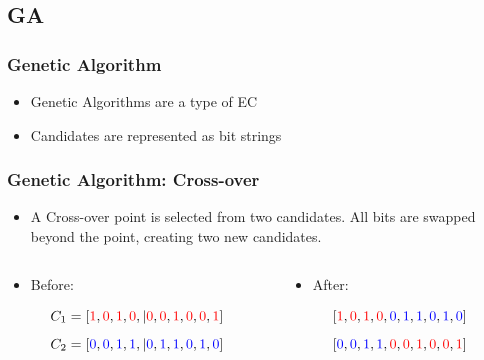 \documentclass{beamer}
\begin{document}
\subsection{GA}
\begin{frame}
  \frametitle{Genetic Algorithm}
\begin{itemize}
  \item Genetic Algorithms are a type of EC
  \item Candidates are represented as bit strings
\end{itemize}
\end{frame}

\begin{frame}

  \frametitle{Genetic Algorithm: Cross-over}
\begin{itemize}
  \item A Cross-over point is selected from two candidates. All bits are swapped beyond the point, creating two new candidates.
\end{itemize}
  \begin{columns}
  \begin{column}{0.5\textwidth}
\begin{itemize}
  \item Before:
\end{itemize}
\[
C_1=[ \textcolor{red}{1},  \textcolor{red}{0}, \textcolor{red}{1},  \textcolor{red}{0},|  \textcolor{red}{0},  \textcolor{red}{0}, \textcolor{red}{1}, \textcolor{red}{0}, \textcolor{red}{0}, \textcolor{red}{1} ]
\]
\[C_2=[  \textcolor{blue}{0}, \textcolor{blue}{0}, \textcolor{blue}{1}, \textcolor{blue}{1},| \textcolor{blue}{0}, \textcolor{blue}{1}, \textcolor{blue}{1}, \textcolor{blue}{0}, \textcolor{blue}{1}, \textcolor{blue}{0} ]
\]
\end{column}
 \begin{column}{0.5\textwidth}
\begin{itemize}
  \item After:
\end{itemize}
   \[
[ \textcolor{red}{1},  \textcolor{red}{0}, \textcolor{red}{1},  \textcolor{red}{0}, \textcolor{blue}{0}, \textcolor{blue}{1}, \textcolor{blue}{1}, \textcolor{blue}{0}, \textcolor{blue}{1}, \textcolor{blue}{0} ]
\]
\[ [  \textcolor{blue}{0}, \textcolor{blue}{0}, \textcolor{blue}{1}, \textcolor{blue}{1}, \textcolor{red}{0},  \textcolor{red}{0}, \textcolor{red}{1}, \textcolor{red}{0}, \textcolor{red}{0}, \textcolor{red}{1} ]
\]
  \end{column}
  \end{columns}
\end{frame}
\end{document}
